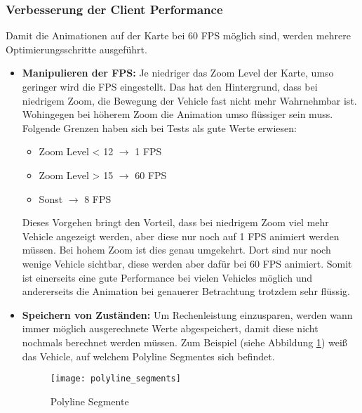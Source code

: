\subsubsection{Verbesserung der Client Performance}
\label{ssub:verbesserung_der_client_performance}

  Damit die Animationen auf der Karte bei 60 FPS möglich sind, werden mehrere Optimierungsschritte ausgeführt.

  \begin{itemize}
    \item \textbf{Manipulieren der FPS:} Je niedriger das Zoom Level der Karte, umso geringer wird die FPS eingestellt. Das hat den Hintergrund, dass bei niedrigem Zoom, die Bewegung der Vehicle fast nicht mehr Wahrnehmbar ist. Wohingegen bei höherem Zoom die Animation umso flüssiger sein muss. Folgende Grenzen haben sich bei Tests als gute Werte erwiesen:
    \begin{itemize}
      \item Zoom Level < 12 $\rightarrow$ 1 FPS
      \item Zoom Level > 15 $\rightarrow$ 60 FPS
      \item Sonst $\rightarrow$ 8 FPS
    \end{itemize}
    Dieses Vorgehen bringt den Vorteil, dass bei niedrigem Zoom viel mehr Vehicle angezeigt werden, aber diese nur noch auf 1 FPS animiert werden müssen. Bei hohem Zoom ist dies genau umgekehrt. Dort sind nur noch wenige Vehicle sichtbar, diese werden aber dafür bei 60 FPS animiert. Somit ist einerseits eine gute Performance bei vielen Vehicles möglich und andererseits die Animation bei genauerer Betrachtung trotzdem sehr flüssig.

    \item \textbf{Speichern von Zuständen:} Um Rechenleistung einzusparen, werden wann immer möglich ausgerechnete Werte abgespeichert, damit diese nicht nochmals berechnet werden müssen. Zum Beispiel (siehe Abbildung \ref{fig:polyline_segments}) weiß das Vehicle, auf welchem Polyline Segment\footnotemark es sich befindet. 


    \begin{figure}[htbp]
      \begin{center}
        \texttt{[image: polyline\_segments]}
        \caption{Polyline Segmente}
        \label{fig:polyline_segments}
      \end{center}
    \end{figure}


\end{itemize}
